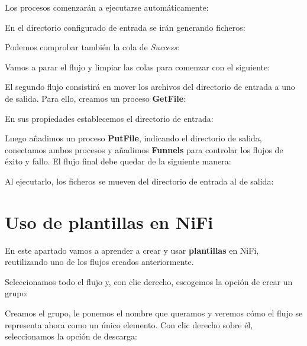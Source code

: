 \documentclass{../../miPlantilla}
\begin{document}

Los procesos comenzarán a ejecutarse automáticamente:


En el directorio configurado de entrada se irán generando ficheros:


\newpage

Podemos comprobar también la cola de \textit{Success}:


Vamos a parar el flujo y limpiar las colas para comenzar con el siguiente:


El segundo flujo consistirá en mover los archivos del directorio de entrada a uno de salida. Para ello, creamos un proceso \textbf{GetFile}:


\newpage

En sus propiedades establecemos el directorio de entrada:


Luego añadimos un proceso \textbf{PutFile}, indicando el directorio de salida, conectamos ambos procesos y añadimos \textbf{Funnels} para controlar los flujos de éxito y fallo.
El flujo final debe quedar de la siguiente manera:


Al ejecutarlo, los ficheros se mueven del directorio de entrada al de salida:


\newpage

\section{Uso de plantillas en NiFi}
En este apartado vamos a aprender a crear y usar \textbf{plantillas} en NiFi, reutilizando uno de los flujos creados anteriormente.

Seleccionamos todo el flujo y, con clic derecho, escogemos la opción de crear un grupo:


Creamos el grupo, le ponemos el nombre que queramos y veremos cómo el flujo se representa ahora como un único elemento. Con clic derecho sobre él, seleccionamos la opción de descarga:
\end{document}
